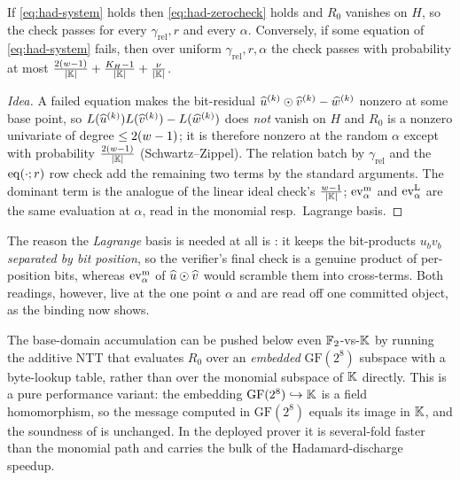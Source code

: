 \begin{lemma}
\label{lem:psi-z-sound}
If \eqref{eq:had-system} holds then \eqref{eq:had-zerocheck} holds and $R_0$
vanishes on $H$, so the check passes for every $\gamma_{\mathrm{rel}},r$ and
every $\alpha$. Conversely, if some equation of \eqref{eq:had-system} fails,
then over uniform $\gamma_{\mathrm{rel}}, r, \alpha$ the check passes with
probability at most
$\frac{2(w-1)}{|\mathbb{K}|}+\frac{K_H-1}{|\mathbb{K}|}+\frac{\nu}{|\mathbb{K}|}$.
\end{lemma}

\begin{proof}[Idea]
A failed equation makes the bit-residual
$\widehat{u}^{(k)}\odot\widehat{v}^{(k)}-\widehat{w}^{(k)}$ nonzero at some base point, so
$L(\widehat{u}^{(k)})L(\widehat{v}^{(k)})-L(\widehat{w}^{(k)})$ does \emph{not} vanish on $H$
and $R_0$ is a nonzero univariate of degree $\le 2(w-1)$; it is therefore
nonzero at the random $\alpha$ except with probability
$\frac{2(w-1)}{|\mathbb{K}|}$ (Schwartz--Zippel). The relation batch by
$\gamma_{\mathrm{rel}}$ and the $\operatorname{eq}(\cdot;r)$ row check add the remaining two
terms by the standard arguments. The dominant term is the analogue of the
linear ideal check's $\frac{w-1}{|\mathbb{K}|}$; $\operatorname{ev}^{\mathrm{m}}_{\alpha}$ and $\operatorname{ev}^{\mathrm{L}}_{\alpha}$ are the same
evaluation at $\alpha$, read in the monomial resp.\ Lagrange basis.
\end{proof}

The reason the \emph{Lagrange} basis is needed at all is
: it keeps the bit-products
$u_bv_b$ \emph{separated by bit position}, so the verifier's final check is a
genuine product of per-position bits, whereas $\operatorname{ev}^{\mathrm{m}}_{\alpha}$ of $\widehat{u}\odot\widehat{v}$
would scramble them into cross-terms. Both readings, however, live at the one
point $\alpha$ and are read off one committed object, as the binding now shows.

\begin{remark}
\label{rem:gf8}
The base-domain accumulation can be pushed below even $\mathbb{F}_2$-vs-$\mathbb{K}$ by
running the additive NTT that evaluates $R_0$ over an \emph{embedded}
$\mathrm{GF}(2^8)$ subspace with a byte-lookup table, rather than over the
monomial subspace of $\mathbb{K}$ directly. This is a pure performance variant: the
embedding $\mathrm{GF}(2^8)\hookrightarrow\mathbb{K}$ is a field homomorphism, so the
message computed in $\mathrm{GF}(2^8)$ equals its image in $\mathbb{K}$, and the
soundness of  is unchanged. In the deployed prover it is
several-fold faster than the monomial path and carries the bulk of the
Hadamard-discharge speedup.
\end{remark}

